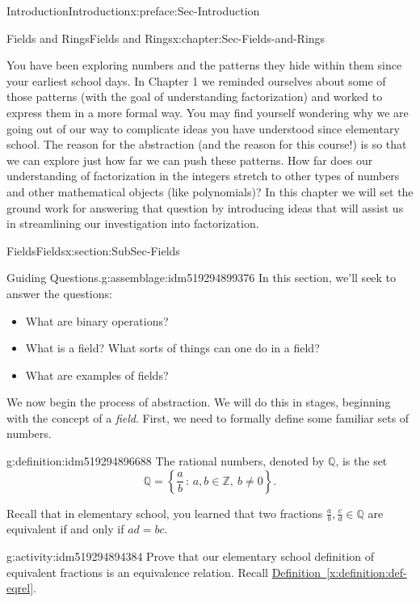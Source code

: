 \documentclass[oneside,10pt,]{book}
\newcommand{\xreffont}{\relax}
\numberwithin{equation}{section}
\newcommand{\setof}[2]{{\left\{#1\,\colon\,#2\right\}}}
\def\Z{{\mathbb Z}}
\def\Q{{\mathbb Q}}
\begin{document}
\begin{preface}{Introduction}{}{Introduction}{}{}{x:preface:Sec-Introduction}
\begin{chapterptx}{Fields and Rings}{}{Fields and Rings}{}{}{x:chapter:Sec-Fields-and-Rings}
\begin{introduction}{}
You have been exploring numbers and the patterns they hide within them since your earliest school days. In Chapter 1 we reminded ourselves about some of those patterns (with the goal of understanding factorization) and worked to express them in a more formal way. You may find yourself wondering why we are going out of our way to complicate ideas you have understood since elementary school. The reason for the abstraction (and the reason for this course!) is so that we can explore just how far we can push these patterns. How far does our understanding of factorization in the integers stretch to other types of numbers and other mathematical objects (like polynomials)? In this chapter we will set the ground work for answering that question by introducing ideas that will assist us in streamlining our investigation into factorization.%
\end{introduction}%
%
%
\typeout{************************************************}
\typeout{************************************************}
%
\begin{sectionptx}{Fields}{}{Fields}{}{}{x:section:SubSec-Fields}
\begin{assemblage}{Guiding Questions.}{g:assemblage:idm519294899376}%
In this section, we'll seek to answer the questions: %
\begin{itemize}[label=\textbullet]
\item{}What are binary operations?%
\item{}What is a field? What sorts of things can one do in a field?%
\item{}What are examples of fields?%
\end{itemize}
%
\end{assemblage}
We now begin the process of abstraction. We will do this in stages, beginning with the concept of a \emph{field}. First, we need to formally define some familiar sets of numbers.%
\begin{definition}{}{g:definition:idm519294896688}%
The rational numbers, denoted by \(\Q\), is the set%
\begin{equation*}
\Q = \setof{\frac{a}{b}}{a,b\in \Z, \ b\ne 0}\text{.}
\end{equation*}
%
\end{definition}
Recall that in elementary school, you learned that two fractions \(\frac{a}{b}, \frac{c}{d} \in \Q\) are equivalent if and only if \(ad=bc\).%
\begin{activity}{}{g:activity:idm519294894384}%
Prove that our elementary school definition of equivalent fractions is an equivalence relation. Recall \hyperref[x:definition:def-eqrel]{Definition~{\xreffont\ref{x:definition:def-eqrel}}}.%

\end{activity}
\end{sectionptx}
\end{chapterptx}
\end{preface}
\end{document}
